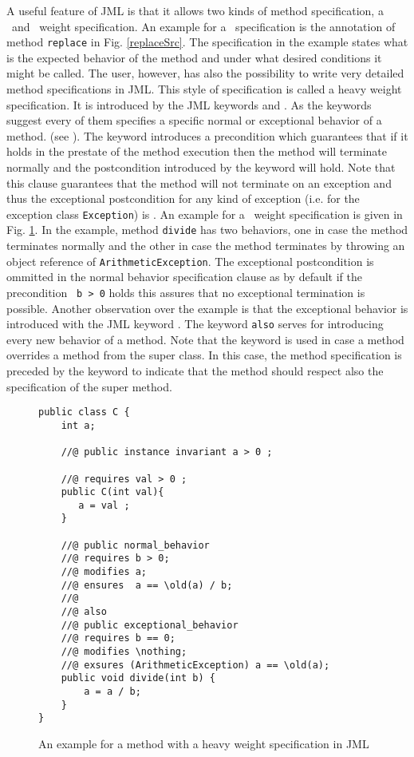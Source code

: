 A useful feature of JML is that it allows two kinds of method specification, a \light  \ and \heavy \ weight specification. 
An example for a \light \  specification is the annotation of method \texttt{replace} in Fig. \ref{replaceSrc}. The specification in 
the example states what is the expected behavior of the method and under what desired conditions it might be called.
The user, however, has also the possibility
to write very detailed method specifications in JML. This style of specification is called a heavy weight specification.
 It is introduced by the JML keywords  and . As the keywords
suggest every of them specifies a specific normal or exceptional behavior of a method.  (see \cite{PD06LBR}). 
The keyword   introduces a precondition which guarantees that if it holds in the prestate of the
 method execution then the method will terminate normally and the postcondition introduced by the keyword  will hold.
 Note that this clause guarantees that the method will not terminate on an exception and thus the exceptional postcondition 
for any kind of exception (i.e. for the exception class  \texttt{Exception}) is  .
An example for a \heavy \ weight specification is given in Fig. \ref{bml:heavySp}. In the example, method \texttt{divide} has 
two behaviors, one in case the method terminates normally and the other in case the method terminates by throwing an object reference of
 \texttt{ArithmeticException}. The exceptional postcondition is ommitted in the normal behavior specification clause as by default
if the precondition \texttt{ b > 0} holds this assures that no exceptional termination is possible. 
Another observation over the example is that the exceptional behavior is introduced with the JML keyword . 
The keyword  \texttt{also} serves for introducing every new behavior of a method. Note that the keyword  is used in case a  method overrides
a method from the super class.
 In this case, the method specification is preceded by the keyword  to indicate that the method should respect also the specification 
of the super method.


   
\begin{figure}
\begin{lstlisting}[frame=trbl]
public class C {
    int a;
    
    //@ public instance invariant a > 0 ;
    
    //@ requires val > 0 ;
    public C(int val){
       a = val ;
    }
   
    //@ public normal_behavior
    //@ requires b > 0;
    //@ modifies a;
    //@ ensures  a == \old(a) / b;  
    //@
    //@ also 
    //@ public exceptional_behavior
    //@ requires b == 0;
    //@ modifies \nothing;
    //@ exsures (ArithmeticException) a == \old(a);
    public void divide(int b) {
        a = a / b;
    }
}
\end{lstlisting}
\caption{\sc An example for a method with a heavy weight specification in JML} \label{bml:heavySp}
\end{figure}

